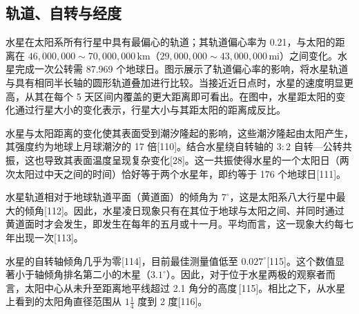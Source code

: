 \subsection{轨道、自转与经度}
水星在太阳系所有行星中具有最偏心的轨道；其轨道偏心率为 0.21，与太阳的距离在 \(46{,}000{,}000\sim70{,}000{,}000\,\mathrm{km}\)（\(29{,}000{,}000\sim43{,}000{,}000\,\mathrm{mi}\)）之间变化。水星完成一次公转需 87.969 个地球日。图示展示了轨道偏心率的影响，将水星轨道与具有相同半长轴的圆形轨道叠加进行比较。当接近近日点时，水星的速度明显更高，从其在每个 5 天区间内覆盖的更大距离即可看出。在图中，水星距太阳的变化通过行星大小的变化表示，行星大小与其距太阳的距离成反比。

水星与太阳距离的变化使其表面受到潮汐隆起的影响，这些潮汐隆起由太阳产生，其强度约为地球上月球潮汐的 17 倍[110]。结合水星绕自转轴的 \(3:2\) 自转—公转共振，这也导致其表面温度呈现复杂变化[28]。这一共振使得水星的一个太阳日（两次太阳过中天之间的时间）恰好等于两个水星年，即约等于 176 个地球日[111]。

水星轨道相对于地球轨道平面（黄道面）的倾角为 \(7^{\circ}\)，这是太阳系八大行星中最大的倾角[112]。因此，水星凌日现象只有在其位于地球与太阳之间、并同时通过黄道面时才会发生，即发生在每年的五月或十一月。平均而言，这一现象大约每七年出现一次[113]。

水星的自转轴倾角几乎为零[114]，目前最佳测量值低至 \(0.027^{\circ}\)[115]。这个数值显著小于轴倾角排名第二小的木星（\(3.1^{\circ}\)）。因此，对于位于水星两极的观察者而言，太阳中心从未升至距离地平线超过 2.1 角分的高度\,[115]。相比之下，从水星上看到的太阳角直径范围从 \(1\tfrac{1}{4}\) 度到 2 度[116]。


























